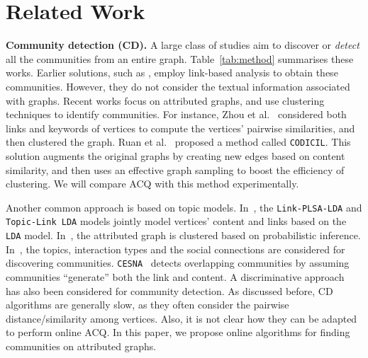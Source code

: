 \section{Related Work}
\label{related}


\textbf{Community detection (CD).} A large class of studies aim to discover or {\it detect} all the communities from an entire graph. Table~\ref{tab:method} summarises these works. Earlier solutions, such as \cite{community-phy2004,community-phy2010}, employ link-based analysis to obtain these communities. However, they do not consider the textual information associated with graphs. Recent works focus on attributed graphs, and use clustering techniques to identify communities.
For instance, Zhou et al.~\cite{attr-vldb2009} considered both links and keywords of vertices to compute the vertices' pairwise similarities, and then clustered the graph.
Ruan et al.~\cite{attr-www2013} proposed a method called {\tt CODICIL}. This solution augments the original graphs by creating new edges based on content similarity, and then uses an effective graph sampling to boost the efficiency of clustering. We will compare ACQ with this method experimentally.

Another common approach is based on topic models. In~\cite{attr-topic-kdd2008,attr-topic-icml2009}, the {\tt Link-PLSA-LDA} and {\tt Topic-Link LDA} models jointly model vertices' content and links based on the {\tt LDA} model. In~\cite{attr-topic-sigmod2012}, the attributed graph is clustered based on probabilistic inference. In~\cite{attr-topic-www2012}, the topics, interaction types and the social connections are considered for discovering communities. {\tt CESNA}~\cite{attr-icdm2013} detects overlapping communities by assuming communities ``generate'' both the link and content. A discriminative approach~\cite{attr-kdd2009} has also been considered for community detection. As discussed before, CD algorithms are generally slow, as they often consider the pairwise distance/similarity among vertices.
Also, it is not clear how they can be adapted to perform online ACQ. In this paper, we propose online algorithms for finding communities on attributed graphs.

